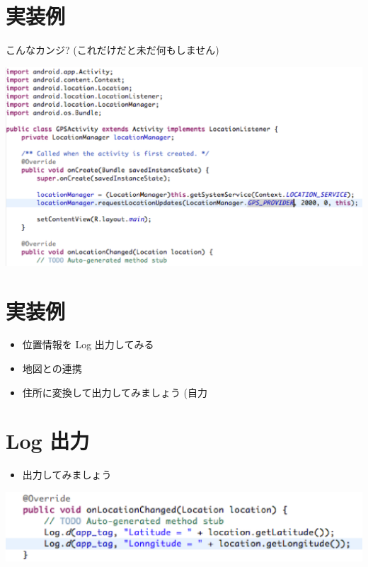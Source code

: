 \documentclass[slide,papersize]{jsarticle}
\begin{document}
\section*{実装例}
{\footnotesize こんなカンジ? (これだけだと未だ何もしません)}
\begin{center}
\includegraphics[scale=0.25]{locationListener.eps}
\end{center}

\section*{実装例}
\bigskip
\begin{itemize}
\item 位置情報を Log 出力してみる
\bigskip
\item 地図との連携
\bigskip
\item 住所に変換して出力してみましょう (自力
\end{itemize}

\section*{Log 出力}
\begin{itemize}
\item 出力してみましょう
\end{itemize}
\begin{center}
\includegraphics[scale=0.4]{locationLog.eps}
\end{center}
\end{document}
